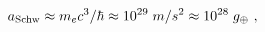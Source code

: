 \begin{equation}\label{amax}
{a}_{\rm Schw} \approx m_e c^3/\hbar \approx 10^{29} \; m/s^2 
\approx 10^{28} \; g_{\oplus}~,
\end{equation}

